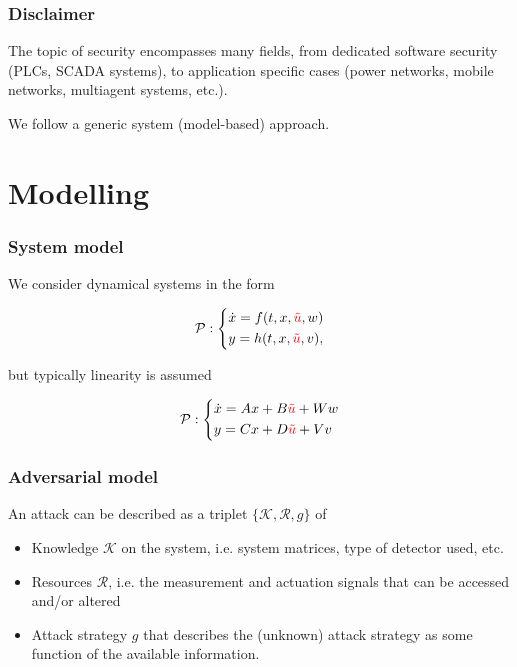 \documentclass[presentation]{beamer}
\begin{document}
\begin{frame}
	\frametitle{Disclaimer}

	The topic of security encompasses many fields, from dedicated software security (PLCs, SCADA systems), to application specific cases (power networks, mobile networks, multiagent systems, etc.).

	\vfill
	We follow a generic system (model-based) approach.
\end{frame}


\section{Modelling}

\begin{frame}
	\frametitle{System model}
	We consider dynamical systems in the form 

	\begin{align*}
		\mathcal P: \left\lbrace
		\begin{aligned}
			&\dot x = f(t,x,\textcolor{red}{\tilde u},w) \\
			&y = h(t,x,\textcolor{red}{\tilde u},v),
		\end{aligned}\right.
	\end{align*}

	but typically linearity is assumed 

	\begin{align*}
	\mathcal P : \left\lbrace
	\begin{aligned}
		&\dot x = Ax + B\textcolor{red}{\tilde u} + Ww\\
		&y = Cx + D\textcolor{red}{\tilde u} + Vv
	\end{aligned}\right.
	\end{align*}
\end{frame}

\begin{frame}
	\frametitle{Adversarial model}
	An attack can be described as a triplet $\{\mathcal K, \mathcal R, g\}$ of
	\smallskip
	\begin{itemize}
		\item<1-> Knowledge $\mathcal K$ on the system, i.e. system matrices, type of detector used, etc.
		\item<2-> Resources $\mathcal R$, i.e. the measurement and actuation signals that can be accessed and/or altered
		\item<3> Attack strategy $g$ that describes the (unknown) attack strategy as some function of the available information.
	\end{itemize}	
\end{frame}
\end{document}
